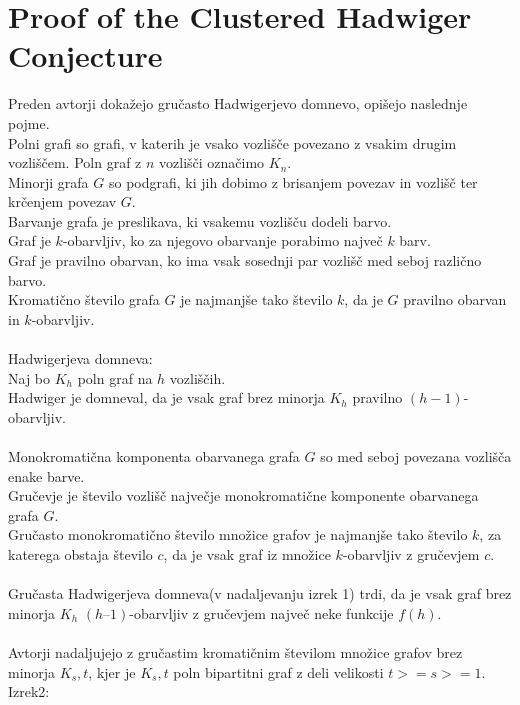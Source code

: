 \documentclass{article}
\begin{document}
\section{Proof of the Clustered Hadwiger Conjecture}
Preden avtorji dokažejo gručasto Hadwigerjevo domnevo, opišejo naslednje pojme.\\



Polni grafi so grafi, v katerih je vsako vozlišče povezano z vsakim drugim vozliščem. Poln graf z $n$ vozlišči označimo $K_n$.\\                                                           
Minorji grafa $G$ so podgrafi, ki jih dobimo z brisanjem povezav in vozlišč ter krčenjem povezav $G$.\\
Barvanje grafa je preslikava, ki vsakemu vozlišču dodeli barvo.\\
Graf je $k$-obarvljiv, ko za njegovo obarvanje porabimo največ $k$ barv.\\
Graf je pravilno obarvan, ko ima vsak sosednji par vozlišč med seboj različno barvo.\\
Kromatično število grafa $G$ je najmanjše tako število $k$, da je $G$ pravilno obarvan in $k$-obarvljiv.\\
\\
Hadwigerjeva domneva:\\
Naj bo $K_h$ poln graf na $h$ vozliščih.\\
Hadwiger je domneval, da je vsak graf brez minorja $K_h$ pravilno $(h - 1)$-obarvljiv.\\
\\
Monokromatična komponenta obarvanega grafa $G$ so med seboj povezana vozlišča enake barve.\\
Gručevje je število vozlišč največje monokromatične komponente obarvanega grafa $G$.\\
Gručasto monokromatično število množice grafov je najmanjše tako število $k$, za katerega obstaja število $c$, da je vsak graf iz množice $k$-obarvljiv z gručevjem $c$.\\
\\
Gručasta Hadwigerjeva domneva(v nadaljevanju izrek 1) trdi, da je vsak graf brez minorja $K_h$ $(h – 1)$-obarvljiv z gručevjem največ neke funkcije $f(h)$.\\
\\
Avtorji nadaljujejo z gručastim kromatičnim številom množice grafov brez minorja $K_s,t$, kjer je $K_s,t$ poln bipartitni graf z deli velikosti $t>=s>=1$.\\
Izrek2:\\
\end{document}
